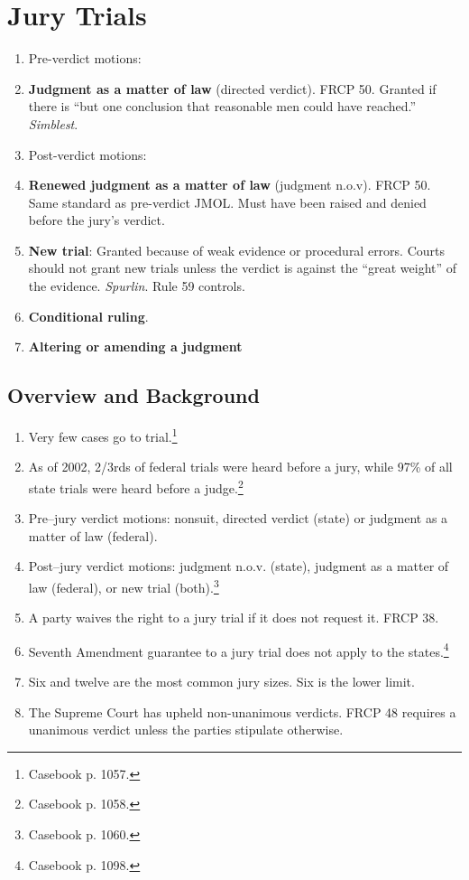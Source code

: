 \section{Jury Trials}

\begin{enumerate}
    \item Pre-verdict motions:
        \item \textbf{Judgment as a matter of law} (directed verdict). FRCP 
        50. Granted if there is ``but one conclusion that reasonable men could 
        have reached.'' \emph{Simblest}.
    \item Post-verdict motions:
        \item \textbf{Renewed judgment as a matter of law} (judgment n.o.v). 
        FRCP 50. Same standard as pre-verdict JMOL. Must have been raised and 
        denied before the jury's verdict.
        \item \textbf{New trial}: Granted because of weak evidence or 
        procedural errors. Courts should not grant new trials unless the 
        verdict is against the ``great weight'' of the evidence.  
        \emph{Spurlin}. Rule 59 controls.
        \item \textbf{Conditional ruling}.
        \item \textbf{Altering or amending a judgment}
\end{enumerate}

\subsection{Overview and Background}

\begin{enumerate}
    \item Very few cases go to trial.\footnote{Casebook p. 1057.}
    \item As of 2002, 2/3rds of federal trials were heard before a jury, while 
    97\% of all state trials were heard before a judge.\footnote{Casebook p. 
    1058.}
    \item Pre--jury verdict motions: nonsuit, directed verdict (state) or 
    judgment as a matter of law (federal).
    \item Post--jury verdict motions: judgment n.o.v. (state), judgment as a 
    matter of law (federal), or new trial (both).\footnote{Casebook p. 1060.}
    \item A party waives the right to a jury trial if it does not request it. 
    FRCP 38.
    \item Seventh Amendment guarantee to a jury trial does not apply to the 
    states.\footnote{Casebook p. 1098.}
    \item Six and twelve are the most common jury sizes. Six is the lower 
    limit.
    \item The Supreme Court has upheld non-unanimous verdicts. FRCP 48 
    requires a unanimous verdict unless the parties stipulate otherwise.
\end{enumerate}

